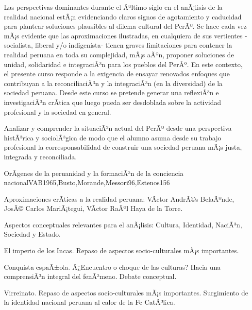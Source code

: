 \begin{syllabus}


\begin{justification}
Las perspectivas dominantes durante el Ãºltimo siglo en el anÃ¡lisis de la realidad nacional estÃ¡n evidenciando claros signos de agotamiento y caducidad para plantear soluciones plausibles al dilema cultural del PerÃº. Se hace cada vez mÃ¡s evidente que las aproximaciones ilustradas, en cualquiera de sus  vertientes -socialista, liberal y/o indigenista- tienen graves limitaciones para contener la realidad peruana en toda su complejidad, mÃ¡s aÃºn, proponer soluciones de unidad, solidaridad e integraciÃ³n para los pueblos del PerÃº. 
En este contexto, el presente curso responde a la exigencia de ensayar renovados enfoques que contribuyan a la reconciliaciÃ³n y la integraciÃ³n (en la diversidad) de la sociedad peruana. Desde este curso se pretende generar una reflexiÃ³n e investigaciÃ³n crÃ­tica que luego pueda ser desdoblada sobre la actividad profesional y la sociedad en general.
\end{justification}

\begin{goals}
\item Analizar y comprender la situaciÃ³n actual del PerÃº desde una perspectiva histÃ³rica y sociolÃ³gica de modo que el alumno asuma desde su trabajo profesional la corresponsabilidad de construir una sociedad peruana mÃ¡s justa, integrada y reconciliada.
\end{goals}

\begin{outcomes}
\end{outcomes}

\begin{unit}{OrÃ­genes de la peruanidad y la formaciÃ³n de la conciencia nacional}{VAB1965,Busto,Morande,Messori96,Estenos}{15}{6}
\begin{topics}
	\item Aproximaciones crÃ­ticas a la realidad peruana: VÃ­ctor AndrÃ©s BelaÃºnde, JosÃ© Carlos MariÃ¡tegui, VÃ­ctor RaÃºl Haya de la Torre.
	\item Aspectos conceptuales relevantes para el anÃ¡lisis: Cultura, Identidad, NaciÃ³n, Sociedad y Estado. 
	\item El imperio de los Incas. Repaso de  aspectos socio-culturales mÃ¡s importantes. 
	\item Conquista espaÃ±ola. Â¿Encuentro o choque de las culturas? Hacia una comprensiÃ³n integral del fenÃ³meno. Debate conceptual. 
	\item Virreinato. Repaso de  aspectos socio-culturales mÃ¡s importantes. Surgimiento de la identidad nacional peruana al calor de la Fe CatÃ³lica.  


\end{topics}
\end{unit}
\end{syllabus}

